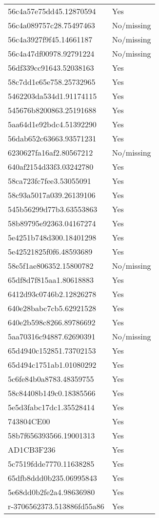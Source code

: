 \begin{tabular}{ll}
56c4a57e75dd45.12870594 & Yes \\
56c4a089757c28.75497463 & No/missing \\
56c4a3927f9f45.14661187 & No/missing \\
56c4a47df00978.92791224 & No/missing \\
56df339cc91643.52038163 & Yes \\
58c7dd1e65e758.25732965 & Yes \\
5462203da534d1.91174115 & Yes \\
545676b8200863.25191688 & Yes \\
5aa64d1e92bdc4.51392290 & Yes \\
56dab652c63663.93571231 & Yes \\
6230627fa16af2.80567212 & No/missing \\
640af2154d33f3.03242780 & Yes \\
58ca723fc7fee3.53055091 & Yes \\
58c93a5017a039.26139106 & Yes \\
545b56299d77b3.63553863 & Yes \\
58b89795e92363.04167274 & Yes \\
5e4251b748d300.18401298 & Yes \\
5e42521825f0f6.48593689 & Yes \\
58e5f1ae806352.15800782 & No/missing \\
65df8d7f815aa1.80618883 & Yes \\
6412d93c0746b2.12826278 & Yes \\
640e28babc7cb5.62921528 & Yes \\
640e2b598c8266.89786692 & Yes \\
5aa70316c94887.62690391 & No/missing \\
65d4940c152851.73702153 & Yes \\
65d494c1751ab1.01080292 & Yes \\
5c6fe84b0a8783.48359755 & Yes \\
58c84408b149c0.18385566 & Yes \\
5e5d3fabc17dc1.35528414 & Yes \\
743804CE00 & Yes \\
58b7f656393566.19001313 & Yes \\
AD1CB3F236 & Yes \\
5c7519fdde7770.11638285 & Yes \\
65dfb8ddd0b235.06995843 & Yes \\
5e68dd0b2fe2a4.98636980 & Yes \\
r-3706562373.513886fd55a86 & Yes \\

\end{tabular}
